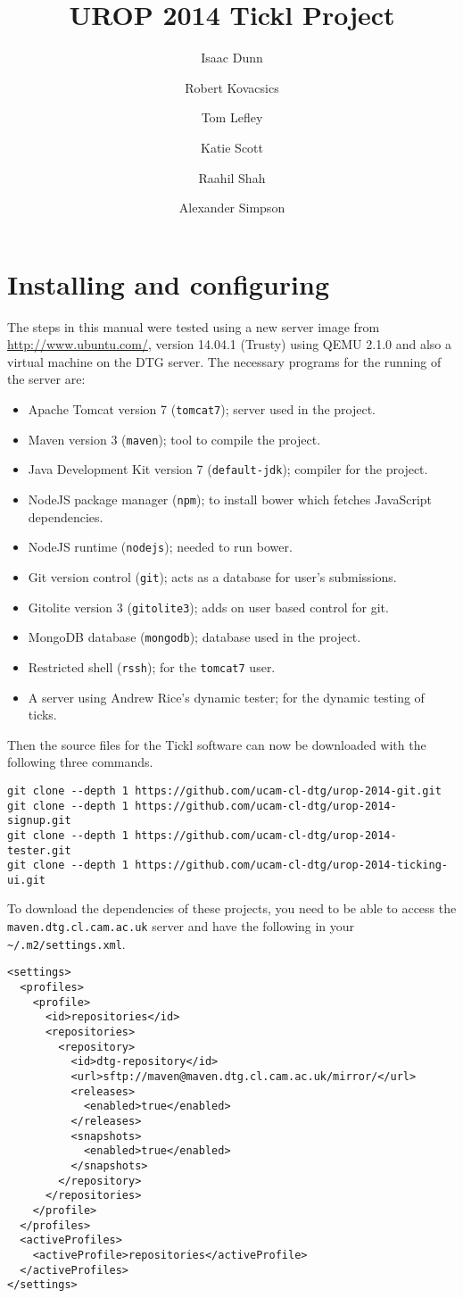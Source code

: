 \documentclass[12pt,a4paper]{article}
\title{\vspace{-48pt}
  UROP 2014 Tickl Project
}
\author{Isaac Dunn
  \and Robert Kovacsics
  \and Tom Lefley
  \and Katie Scott
  \and Raahil Shah
  \and Alexander Simpson
}
\begin{document}
\maketitle
\section{Installing and configuring}
The steps in this manual were tested using a new server image from \url{http://www.ubuntu.com/}, version 14.04.1 (Trusty) using QEMU 2.1.0 and also a virtual machine on the DTG server.
The necessary programs for the running of the server are:
\begin{itemize}
  \item Apache Tomcat version 7 ({\tt tomcat7}); server used in the project.
  \item Maven version 3 ({\tt maven}); tool to compile the project.
  \item Java Development Kit version 7 ({\tt default-jdk}); compiler for the project.
  \item NodeJS package manager ({\tt npm}); to install bower which fetches JavaScript dependencies.
  \item NodeJS runtime ({\tt nodejs}); needed to run bower.
  \item Git version control ({\tt git}); acts as a database for user's submissions.
  \item Gitolite version 3 ({\tt gitolite3}); adds on user based control for git.
  \item MongoDB database ({\tt mongodb}); database used in the project.
  \item Restricted shell ({\tt rssh}); for the {\tt tomcat7} user.
  \item A server using Andrew Rice's dynamic tester; for the dynamic testing of ticks.
\end{itemize}

Then the source files for the Tickl software can now be downloaded with the following three commands.
\begin{verbatim}
git clone --depth 1 https://github.com/ucam-cl-dtg/urop-2014-git.git
git clone --depth 1 https://github.com/ucam-cl-dtg/urop-2014-signup.git
git clone --depth 1 https://github.com/ucam-cl-dtg/urop-2014-tester.git
git clone --depth 1 https://github.com/ucam-cl-dtg/urop-2014-ticking-ui.git
\end{verbatim}

To download the dependencies of these projects, you need to be able to access the {\tt maven.dtg.cl.cam.ac.uk} server and have the following in your {\tt \~{}/.m2/settings.xml}.
\begin{verbatim}
<settings>
  <profiles>
    <profile>
      <id>repositories</id>
      <repositories>
        <repository>
          <id>dtg-repository</id>
          <url>sftp://maven@maven.dtg.cl.cam.ac.uk/mirror/</url>
          <releases>
            <enabled>true</enabled>
          </releases>
          <snapshots>
            <enabled>true</enabled>
          </snapshots>
        </repository>
      </repositories>
    </profile>
  </profiles>
  <activeProfiles>
    <activeProfile>repositories</activeProfile>
  </activeProfiles>
</settings>
\end{verbatim}
\end{document}
